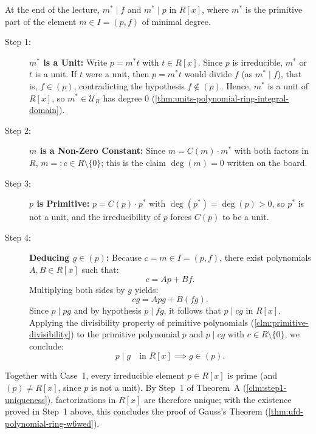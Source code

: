 \begin{proofWrapper}
\begin{content}
\begin{steps}
At the end of the lecture, $m^* \mid f$ and $m^* \mid p$ in $R[x]$, where $m^*$ is the primitive part of the element $m \in I = (p, f)$ of minimal degree.
\begin{description}
    \item[Step 1:] \textbf{$m^*$ is a Unit:} Write $p = m^* t$ with $t \in R[x]$. Since $p$ is irreducible, $m^*$ or $t$ is a unit. If $t$ were a unit, then $p = m^* t$ would divide $f$ (as $m^* \mid f$), that is, $f \in (p)$, contradicting the hypothesis $f \notin (p)$. Hence, $m^*$ is a unit of $R[x]$, so $m^* \in \mathcal{U}_R$ has degree $0$ (\cref{thm:units-polynomial-ring-integral-domain}).
    \item[Step 2:] \textbf{$m$ is a Non-Zero Constant:} Since $m = C(m) \cdot m^*$ with both factors in $R$, $m =: c \in R \setminus \{0\}$; this is the claim $\deg(m) = 0$ written on the board.
    \item[Step 3:] \textbf{$p$ is Primitive:} $p = C(p) \cdot p^*$ with $\deg(p^*) = \deg(p) > 0$, so $p^*$ is not a unit, and the irreducibility of $p$ forces $C(p)$ to be a unit.
    \item[Step 4:] \textbf{Deducing $g \in (p)$:} Because $c = m \in I = (p, f)$, there exist polynomials $A, B \in R[x]$ such that:
    \[
    c = A p + B f.
    \]
    Multiplying both sides by $g$ yields:
    \[
    c g = A p g + B (f g).
    \]
    Since $p \mid p g$ and by hypothesis $p \mid f g$, it follows that $p \mid cg$ in $R[x]$.
    Applying the divisibility property of primitive polynomials (\cref{clm:primitive-divisibility}) to the primitive polynomial $p$ and $p \mid c g$ with $c \in R \setminus \{0\}$, we conclude:
    \[
    p \mid g \quad \text{in } R[x] \implies g \in (p).
    \]
\end{description}
Together with Case~1, every irreducible element $p \in R[x]$ is prime (and $(p) \neq R[x]$, since $p$ is not a unit). By Step~1 of Theorem~A (\cref{clm:step1-uniqueness}), factorizations in $R[x]$ are therefore unique; with the existence proved in Step~1 above, this concludes the proof of Gauss's Theorem (\cref{thm:ufd-polynomial-ring-w6wed}).
\end{steps}
\end{content}

\end{proofWrapper}

